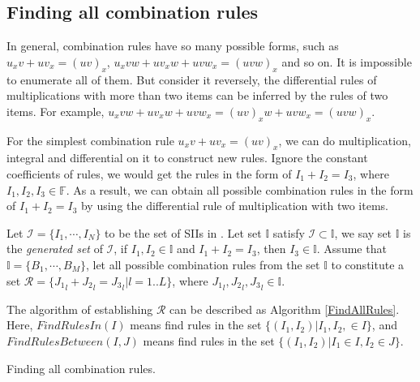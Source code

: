 \subsection{Finding all combination rules}\label{all_rules-03}

In general, combination rules have so many possible forms, such as $u_x v + u v_x = (uv)_x$, $u_x v w+u v_x w + u v w_x = (uvw)_x$ and so on. It is impossible to enumerate all of them. But consider it reversely, the differential rules of multiplications with more than two items can be inferred by the rules of two items. For example, $u_xvw+uv_xw+uvw_x=(uv)_xw+uvw_x=(uvw)_x$.  

For the simplest combination rule $u_x v + u v_x = (uv)_x$, we can do multiplication, integral and  differential on it to construct new rules. Ignore the constant coefficients of rules, we would get the rules in the form of $I_1+I_2=I_3$, where $I_1,I_2,I_3\in \mathbb F$. As a result, we can obtain all possible combination rules in the form of $I_1+I_2=I_3$ by using the differential rule of multiplication with two items.

Let $\mathcal I =\{I_1,\cdots,I_N\}$ to be the set of SIIs in . Let set $\mathbb I$ satisfy $\mathcal I \subset \mathbb I$, we say set $\mathbb I$ is the \emph{generated set} of $\mathcal I$, if $I_1,I_2\in \mathbb I$ and $I_1+I_2=I_3$, then $I_3\in \mathbb I$. Assume that $\mathbb I=\{B_1,\cdots,B_M\}$, let all possible combination rules from the set $\mathbb I$ to constitute a set $\mathcal R=\{{J_1}_l+{J_2}_l={J_3}_l|l=1..L\}$, where ${J_1}_l,{J_2}_l,{J_3}_l \in \mathbb I$.

The algorithm of establishing $\mathcal R$ can be described as Algorithm \ref{FindAllRules}. Here, $FindRulesIn(I)$ means find rules in the set $\{(I_1,I_2)|I_1,I_2,\in I\}$, and $FindRulesBetween(I,J)$ means find rules in the set $\{(I_1,I_2)|I_1\in I, I_2\in J\}$.

\begin{algorithm}
\caption{Finding all combination rules.}
\label{FindAllRules}
\end{algorithm}

